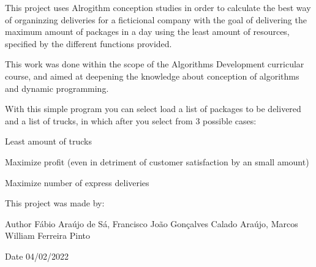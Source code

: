 This project uses Alrogithm conception studies in order to calculate the best way of organinzing deliveries for a ficticional company with the goal of delivering the maximum amount of packages in a day using the least amount of resources, specified by the different functions provided.

This work was done within the scope of the Algorithms Development curricular course, and aimed at deepening the knowledge about conception of algorithms and dynamic programming.

With this simple program you can select load a list of packages to be delivered and a list of trucks, in which after you select from 3 possible cases\+:
\begin{DoxyItemize}
\item Least amount of trucks
\item Maximize profit (even in detriment of customer satisfaction by an small amount)
\item Maximize number of express deliveries
\end{DoxyItemize}

This project was made by\+: \begin{DoxyAuthor}{Author}
Fábio Araújo de Sá, Francisco João Gonçalves Calado Araújo, Marcos William Ferreira Pinto
\end{DoxyAuthor}
\begin{DoxyDate}{Date}
04/02/2022 
\end{DoxyDate}
